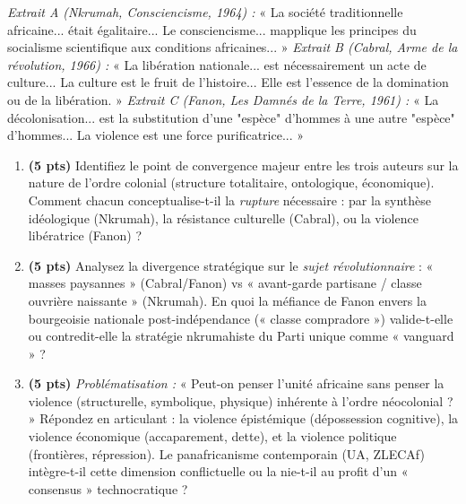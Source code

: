 \documentclass[11pt]{article}
\begin{document}
\begin{exercice}
\textit{Extrait A (Nkrumah, \textit{Consciencisme}, 1964) :} « La société traditionnelle africaine... était égalitaire... Le consciencisme... mapplique les principes du socialisme scientifique aux conditions africaines... »
\textit{Extrait B (Cabral, \textit{Arme de la révolution}, 1966) :} « La libération nationale... est nécessairement un acte de culture... La culture est le fruit de l'histoire... Elle est l'essence de la domination ou de la libération. »
\textit{Extrait C (Fanon, \textit{Les Damnés de la Terre}, 1961) :} « La décolonisation... est la substitution d'une "espèce" d'hommes à une autre "espèce" d'hommes... La violence est une force purificatrice... »
\begin{enumerate}
    \item \textbf{(5 pts)} Identifiez le point de convergence majeur entre les trois auteurs sur la nature de l'ordre colonial (structure totalitaire, ontologique, économique). Comment chacun conceptualise-t-il la \textit{rupture} nécessaire : par la synthèse idéologique (Nkrumah), la résistance culturelle (Cabral), ou la violence libératrice (Fanon) ?
    \item \textbf{(5 pts)} Analysez la divergence stratégique sur le \textit{sujet révolutionnaire} : « masses paysannes » (Cabral/Fanon) vs « avant-garde partisane / classe ouvrière naissante » (Nkrumah). En quoi la méfiance de Fanon envers la bourgeoisie nationale post-indépendance (« classe compradore ») valide-t-elle ou contredit-elle la stratégie nkrumahiste du Parti unique comme « vanguard » ?
    \item \textbf{(5 pts)} \textit{Problématisation :} « Peut-on penser l'unité africaine sans penser la violence (structurelle, symbolique, physique) inhérente à l'ordre néocolonial ? » Répondez en articulant : la violence épistémique (dépossession cognitive), la violence économique (accaparement, dette), et la violence politique (frontières, répression). Le panafricanisme contemporain (UA, ZLECAf) intègre-t-il cette dimension conflictuelle ou la nie-t-il au profit d'un « consensus » technocratique ?
\end{enumerate}
\end{exercice}
\end{document}
